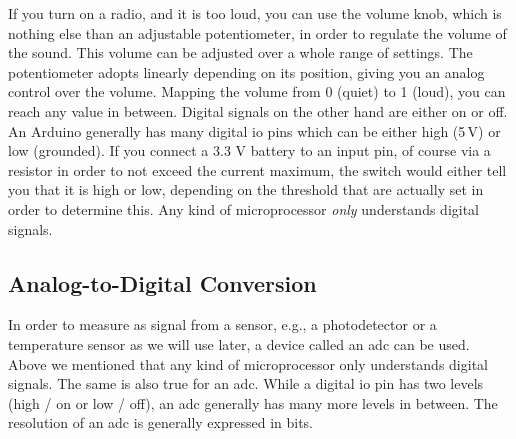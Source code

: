 If you turn on a radio, and it is too loud, you can use the volume knob, which is nothing else than an adjustable potentiometer, in order to regulate the volume of the sound. This volume can be adjusted over a whole range of settings. The potentiometer adopts linearly depending on its position, giving you an analog control over the volume. Mapping the volume from 0 (quiet) to 1 (loud), you can reach any value in between. Digital signals on the other hand are either on or off. An Arduino generally has many digital \ac{io} pins which can be either high (5\,V) or low (grounded). If you connect a 3.3 V battery to an input pin, of course via a resistor in order to not exceed the current maximum, the switch would either tell you that it is high or low, depending on the threshold that are actually set in order to determine this. Any kind of microprocessor \textit{only} understands digital signals. 

\subsection{Analog-to-Digital Conversion}
In order to measure as signal from a sensor, e.g., a photodetector or a temperature sensor as we will use later, a device called an \ac{adc} can be used. Above we mentioned that any kind of microprocessor only understands digital signals. The same is also true for an \ac{adc}. While a digital \ac{io} pin has two levels (high / on or low / off), an \ac{adc} generally has many more levels in between. The resolution of an \ac{adc} is generally expressed in bits.


